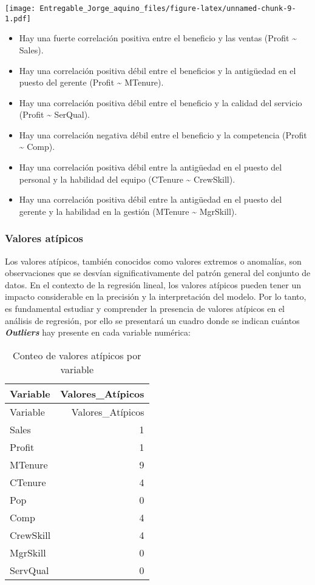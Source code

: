 \documentclass[
]{article}
\providecommand{\tightlist}{%
  \setlength{\itemsep}{0pt}\setlength{\parskip}{0pt}}
\begin{document}
\texttt{[image: Entregable\_Jorge\_aquino\_files/figure-latex/unnamed-chunk-9-1.pdf]}

\begin{itemize}
\tightlist
\item
  Hay una fuerte correlación positiva entre el beneficio y las ventas
  (Profit \textasciitilde{} Sales).
\item
  Hay una correlación positiva débil entre el beneficios y la antigüedad
  en el puesto del gerente (Profit \textasciitilde{} MTenure).
\item
  Hay una correlación positiva débil entre el beneficio y la calidad del
  servicio (Profit \textasciitilde{} SerQual).
\item
  Hay una correlación negativa débil entre el beneficio y la competencia
  (Profit \textasciitilde{} Comp).
\item
  Hay una correlación positiva débil entre la antigüedad en el puesto
  del personal y la habilidad del equipo (CTenure \textasciitilde{}
  CrewSkill).
\item
  Hay una correlación positiva débil entre la antigüedad en el puesto
  del gerente y la habilidad en la gestión (MTenure \textasciitilde{}
  MgrSkill).
\end{itemize}

\hypertarget{valores-atuxedpicos}{%
\subsubsection{Valores atípicos}\label{valores-atuxedpicos}}

Los valores atípicos, también conocidos como valores extremos o
anomalías, son observaciones que se desvían significativamente del
patrón general del conjunto de datos. En el contexto de la regresión
lineal, los valores atípicos pueden tener un impacto considerable en la
precisión y la interpretación del modelo. Por lo tanto, es fundamental
estudiar y comprender la presencia de valores atípicos en el análisis de
regresión, por ello se presentará un cuadro donde se indican cuántos
\textbf{\emph{Outliers}} hay presente en cada variable numérica:

\begin{longtable}[]{@{}lr@{}}
\caption{Conteo de valores atípicos por variable}\tabularnewline
\toprule\noalign{}
Variable & Valores\_Atípicos \\
\midrule\noalign{}
\endfirsthead
\toprule\noalign{}
Variable & Valores\_Atípicos \\
\midrule\noalign{}
\endhead
\bottomrule\noalign{}
\endlastfoot
Sales & 1 \\
Profit & 1 \\
MTenure & 9 \\
CTenure & 4 \\
Pop & 0 \\
Comp & 4 \\
CrewSkill & 4 \\
MgrSkill & 0 \\
ServQual & 0 \\
\end{longtable}
\end{document}
